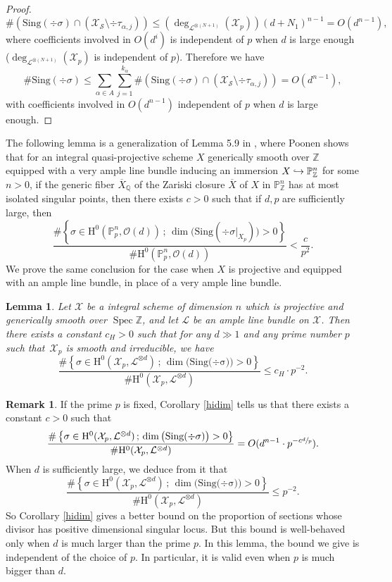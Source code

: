 \documentclass[JEP,XML,SOM,Unicode,published]{cedram}
\newcommand\hto{\mathrel{\lhook\joinrel\to}}
\newcommand{\sep}{\,;\,}
\theoremstyle{plain}
\newtheorem{lem}[thm]{Lemma}
\theoremstyle{definition}
\newtheorem*{rmq}{Remark}
\newcommand{\ho}{\mathrm{H}}
\newcommand{\X}{\mathcal{X}}
\newcommand{\li}{\mathcal{L}}
\newcommand{\Q}{\mathbb{Q}}
\newcommand{\Z}{\mathbb{Z}}
\newcommand{\pr}{\mathbb{P}}
\DeclareMathOperator{\Spec}{Spec}
\begin{document}
\begin{proof}
\[
\#\left(\mathrm{Sing}(\div \sigma)\cap \left(\X_{\mathcal{S}}\setminus \div \tau_{\alpha,j}\right) \right)\leq (\deg_{\li^{\otimes (N+1)}}(\X_p))(d+N_1)^{n-1}=O(d^{n-1}),
\]
where coefficients involved in $O(d^i)$ is independent of $p$ when $d$ is large enough ($\deg_{\li^{\otimes (N+1)}}(\X_p)$ is independent of $p$). Therefore we have
\[
\# \mathrm{Sing}(\div \sigma) \leq \sum_{\alpha\in A}\sum_{j=1}^{k_{\alpha}} \#\left(\mathrm{Sing}(\div \sigma)\cap \left(\X_{\mathcal{S}}\setminus \div \tau_{\alpha,j}\right) \right)=O(d^{n-1}),
\]
with coefficients involved in $O(d^{n-1})$ independent of $p$ when $d$ is large enough.
\end{proof}

The following lemma is a generalization of Lemma 5.9 in \cite{Po04}, where Poonen shows that for an integral quasi-projective scheme $X$ generically smooth over $\Z$ equipped with a very ample line bundle inducing an immersion $X\hto \pr^n_{\Z}$ for some $n>0$, if the generic fiber $\overline{X}_{\Q}$ of the Zariski closure $\overline{X}$ of $X$ in $\pr^n_{\Z}$ has at most isolated singular points, then there exists $c>0$ such that if $d,p$ are sufficiently large, then
\[
\frac{\#\left\{ \sigma\in \ho^0(\pr^n_{p},\mathcal{O}(d)) \sep \dim\bigl(\mathrm{Sing}(\div \sigma|_{X_p})\bigr)>0 \right\}}{\#\ho^0(\pr^n_{p},\mathcal{O}(d))}<\frac{c}{p^2}.
\]
We prove the same conclusion for the case when $X$ is projective and equipped with an ample line bundle, in place of a very ample line bundle.
\begin{lem}\label{posdivsing}
Let $\X$ be a integral scheme of dimension $n$ which is projective and generically smooth over $\Spec \Z$, and let $\li$ be an ample line bundle on $\X$. Then there exists a constant $c_H>0$ such that for any $d\gg 1$ and any prime number $p$ such that~$\X_p$ is smooth and irreducible, we have
\[
\frac{\#\left\{ \sigma\in \ho^0(\X_p, \li^{\otimes d})\sep \dim\big(\mathrm{Sing(\div \sigma})\big)>0 \right\}}{\#\ho^0(\X_p, \li^{\otimes d})}\leq c_H\cdot p^{-2}.
\]
\end{lem}
\begin{rmq}
If the prime $p$ is fixed, Corollary \ref{hidim} tells us that there exists a constant $c>0$ such that
\[
\frac{\#\left\{ \sigma\in \ho^0(\X_p, \li^{\otimes d})\sep \dim\big(\mathrm{Sing(\div \sigma})\big)>0 \right\}}{\#\ho^0(\X_p, \li^{\otimes d})}=O(d^{n-1}\cdot p^{-c\sfrac{d}{p}}).
\]
When $d$ is sufficiently large, we deduce from it that
\[
\frac{\#\left\{ \sigma\in \ho^0(\X_p, \li^{\otimes d})\sep \dim\big(\mathrm{Sing(\div \sigma})\big)>0 \right\}}{\#\ho^0(\X_p, \li^{\otimes d})}\leq p^{-2}.
\]
So Corollary \ref{hidim} gives a better bound on the proportion of sections whose divisor has positive dimensional singular locus. But this bound is well-behaved only when $d$ is much larger than the prime $p$. In this lemma, the bound we give is independent of the choice of $p$. In particular, it is valid even when $p$ is much bigger than $d$.
\end{rmq}
\end{document}
